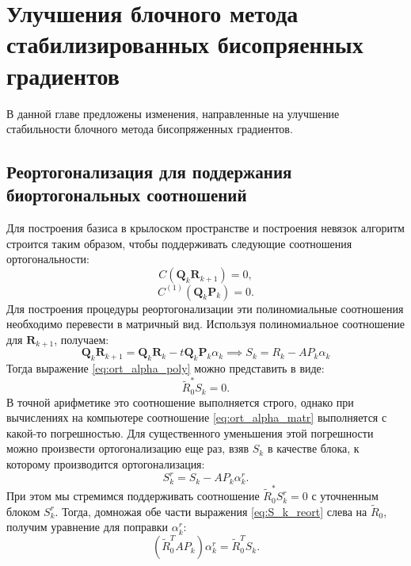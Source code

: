 \section{Улучшения блочного метода стабилизированных бисопряенных градиентов}
\label{sec:Chapter3} 
В данной главе предложены изменения, направленные на улучшение стабильности блочного метода 
бисопряженных градиентов. 
\subsection{Реортогонализация для поддержания биортогональных соотношений}
Для построения базиса в крылоском пространстве и построения невязок алгоритм 
строится таким образом, чтобы поддерживать следующие соотношения ортогональности:
\begin{equation}
    \label{eq:ort_alpha_poly}
    C(\mathbf{Q}_{k} \mathbf{R}_{k+1}) = 0,
\end{equation}
\begin{equation}
    \label{eq:ort_beta_poly}
    C^{(1)}(\mathbf{Q}_{k} \mathbf{P}_k) = 0. 
\end{equation}
Для построения процедуры реортогонализации эти полиномиальные соотношения необходимо 
перевести в матричный вид.
Используя полиномиальное соотношение для $\mathbf{R}_{k+1}$, получаем:
$$\mathbf{Q}_{k}\mathbf{R}_{k+1} = \mathbf{Q}_{k}\mathbf{R}_{k} - t\mathbf{Q}_{k}\mathbf{P}_{k}\alpha_k \implies S_k = R_k - AP_k\alpha_k $$
Тогда выражение \eqref{eq:ort_alpha_poly} можно представить в виде:
\begin{equation}
    \label{eq:ort_alpha_matr}
    \tilde{R}_0^* S_k = 0.
\end{equation}
В точной арифметике это соотношение выполняется строго, однако при вычислениях на компьютере 
соотношение \eqref{eq:ort_alpha_matr} выполняется с какой-то погрешностью. Для существенного уменьшения 
этой погрешности можно произвести ортогонализацию еще раз, взяв $S_k$ в качестве блока, к которому производится
ортогонализация:
\begin{equation}
    \label{eq:S_k_reort}
    S_k^{r} = S_k - AP_k\alpha_k^r.
\end{equation}
При этом мы стремимся поддерживать соотношение $\tilde{R}_0^*S_k^r=0$ с уточненным блоком $S_k^r$.
Тогда, домножая обе части выражения \eqref{eq:S_k_reort} слева на $\tilde{R}_0$, получим уравнение для 
поправки $\alpha_k^r$:
\begin{equation*}
    (\tilde{R}_0^TAP_k)\alpha_k^r = \tilde{R}_0^TS_k.
\end{equation*}

